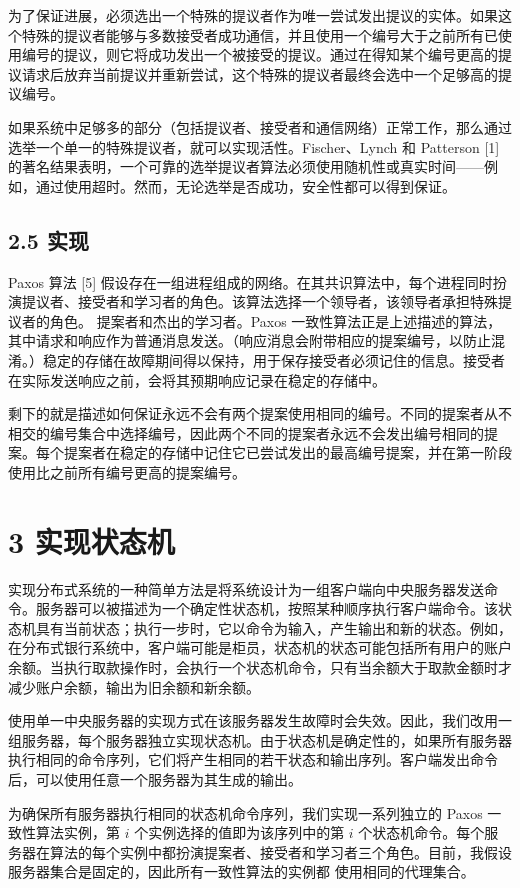 \documentclass[12pt,a4paper]{report} %
\begin{document}
为了保证进展，必须选出一个特殊的提议者作为唯一尝试发出提议的实体。如果这个特殊的提议者能够与多数接受者成功通信，并且使用一个编号大于之前所有已使用编号的提议，则它将成功发出一个被接受的提议。通过在得知某个编号更高的提议请求后放弃当前提议并重新尝试，这个特殊的提议者最终会选中一个足够高的提议编号。

如果系统中足够多的部分（包括提议者、接受者和通信网络）正常工作，那么通过选举一个单一的特殊提议者，就可以实现活性。Fischer、Lynch 和 Patterson [1] 的著名结果表明，一个可靠的选举提议者算法必须使用随机性或真实时间——例如，通过使用超时。然而，无论选举是否成功，安全性都可以得到保证。

\subsection*{2.5 实现}

Paxos 算法 [5] 假设存在一组进程组成的网络。在其共识算法中，每个进程同时扮演提议者、接受者和学习者的角色。该算法选择一个领导者，该领导者承担特殊提议者的角色。
提案者和杰出的学习者。Paxos 一致性算法正是上述描述的算法，其中请求和响应作为普通消息发送。（响应消息会附带相应的提案编号，以防止混淆。）稳定的存储在故障期间得以保持，用于保存接受者必须记住的信息。接受者在实际发送响应之前，会将其预期响应记录在稳定的存储中。

剩下的就是描述如何保证永远不会有两个提案使用相同的编号。不同的提案者从不相交的编号集合中选择编号，因此两个不同的提案者永远不会发出编号相同的提案。每个提案者在稳定的存储中记住它已尝试发出的最高编号提案，并在第一阶段使用比之前所有编号更高的提案编号。

\section*{3 实现状态机}

实现分布式系统的一种简单方法是将系统设计为一组客户端向中央服务器发送命令。服务器可以被描述为一个确定性状态机，按照某种顺序执行客户端命令。该状态机具有当前状态；执行一步时，它以命令为输入，产生输出和新的状态。例如，在分布式银行系统中，客户端可能是柜员，状态机的状态可能包括所有用户的账户余额。当执行取款操作时，会执行一个状态机命令，只有当余额大于取款金额时才减少账户余额，输出为旧余额和新余额。

使用单一中央服务器的实现方式在该服务器发生故障时会失效。因此，我们改用一组服务器，每个服务器独立实现状态机。由于状态机是确定性的，如果所有服务器执行相同的命令序列，它们将产生相同的若干状态和输出序列。客户端发出命令后，可以使用任意一个服务器为其生成的输出。

为确保所有服务器执行相同的状态机命令序列，我们实现一系列独立的 Paxos 一致性算法实例，第 $i$ 个实例选择的值即为该序列中的第 $i$ 个状态机命令。每个服务器在算法的每个实例中都扮演提案者、接受者和学习者三个角色。目前，我假设服务器集合是固定的，因此所有一致性算法的实例都
使用相同的代理集合。
\end{document}
